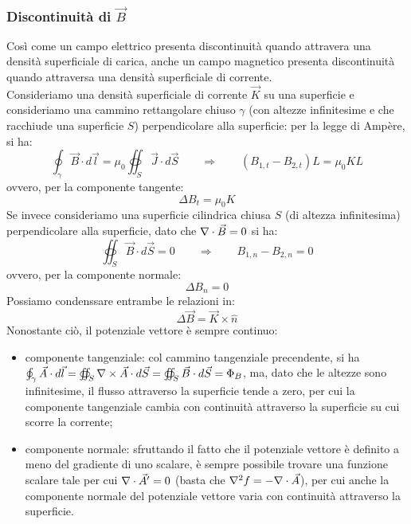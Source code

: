 \documentclass[]{article}
\begin{document}
\subsubsection{Discontinuità di $ \vec{B} $}

Così come un campo elettrico presenta discontinuità quando attravera una densità superficiale di carica, anche un campo magnetico presenta discontinuità quando attraversa una densità superficiale di corrente. \\ 
%
Consideriamo una densità superficiale di corrente $ \vec{K} $ su una superficie e consideriamo una cammino rettangolare chiuso $ \gamma $ (con altezze infinitesime e che racchiude una superficie $ S $) perpendicolare alla superficie: per la legge di Ampère, si ha:
\begin{equation}
	\oint_{\gamma} \vec{B}\cdot d\vec{l} = \mu_0 \oiint_S \vec{J}\cdot d\vec{S} \qquad\Longrightarrow\qquad (B_{1,t} - B_{2,t}) L = \mu_0 KL
	\label{eq:15}
\end{equation}
ovvero, per la componente tangente:
\begin{equation}
	\Delta B_t = \mu_0 K
	\label{eq:16}
\end{equation}
Se invece consideriamo una superficie cilindrica chiusa $ S $ (di altezza infinitesima) perpendicolare alla superficie, dato che $ \nabla\cdot\vec{B} = 0 $ si ha:
\begin{equation}
	\oiint_S \vec{B}\cdot d\vec{S} = 0 \qquad\Longrightarrow\qquad B_{1,n} - B_{2,n} = 0 
	\label{eq:17}
\end{equation}
ovvero, per la componente normale:
\begin{equation}
	\Delta B_n = 0 
	\label{eq:18}
\end{equation}
Possiamo condenssare entrambe le relazioni in:
\begin{equation}
	\Delta\vec{B} = \vec{K}\times\hat{n}
	\label{eq:19}
\end{equation}
Nonostante ciò, il potenziale vettore è sempre continuo:
\begin{itemize}
	\item componente tangenziale: col cammino tangenziale precendente, si ha $ \oint_{\gamma} \vec{A}\cdot d\vec{l} = \oiint_S \nabla\times\vec{A}\cdot d\vec{S} = \oiint_S \vec{B}\cdot d\vec{S} = \Phi_B $, ma, dato che le altezze sono infinitesime, il flusso attraverso la superficie tende a zero, per cui la componente tangenziale cambia con continuità attraverso la superficie su cui scorre la corrente;
	\item componente normale: sfruttando il fatto che il potenziale vettore è definito a meno del gradiente di uno scalare, è sempre possibile trovare una funzione scalare tale per cui $ \nabla\cdot\vec{A}' = 0 $ (basta che $ \nabla^2 f = -\nabla\cdot\vec{A} $), per cui anche la componente normale del potenziale vettore varia con continuità attraverso la superficie.
\end{itemize}
\end{document}
